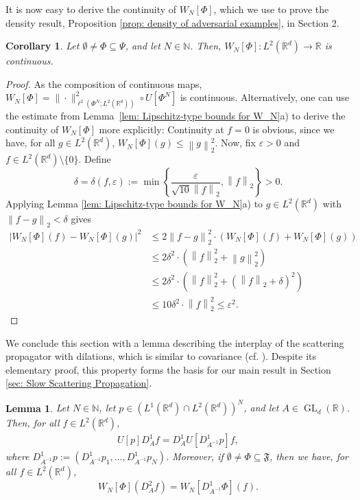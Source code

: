 \documentclass[11pt]{amsart}
\newcommand{\R}{{\mathbb{R}}}
\newcommand{\N}{\mathbb{N}}
\newcommand{\norm}[1]{\ensuremath{\left\lVert\text{}#1\text{}\right\rVert}}
\DeclareMathOperator{\GL}{GL}
\newtheorem{lemma}[theorem]{Lemma}
\newtheorem{corollary}[theorem]{Corollary}
\newenvironment{proof sketch} {\textit{Proof sketch.}}{}
\begin{document}
  It is now easy to derive the continuity of $W_N[\Phi]$, which we use to prove the density result, Proposition \ref{prop: density of adversarial examples}, in Section 2. 
  \begin{corollary}\label{cor: W_N is continuous}
    Let $\emptyset \neq \Phi \subseteq \Psi$, and let $N \in \N$. Then, $W_N[\Phi]:L^2(\R^d)\to \R$ is continuous.
  \end{corollary}
  \begin{proof}
    As the composition of continuous maps, $W_N[\Phi]= \lVert \text{} \cdot \text{} \rVert _{
    \ell ^{2}(\Phi ^{N};L^{2}({\mathbb{R}}^{d}))}^{2} \circ U[\Phi ^{N}]$ is continuous. Alternatively, one can use the estimate from Lemma~\ref{lem: Lipschitz-type bounds for W_N}a) to derive the continuity of $W_N[\Phi]$ more explicitly: Continuity at $f=0$ is obvious, since we have, for all $g \in L^2(\R^d)$, $W_N[\Phi](g)\leq \norm{g}_2^2$. Now, fix $\varepsilon>0$ and $f \in L^2(\R^d)\setminus\{0\}$. Define \[\delta=\delta(f,\varepsilon):=\min\left\{\frac{\varepsilon}{\sqrt{10} \norm{f}_2},\norm{f}_2\right\}>0.\] 
    Applying Lemma \ref{lem: Lipschitz-type bounds for W_N}a) to $g \in L^2(\R^d)$ with $\norm{f-g}_2<\delta$ gives
    \begin{align*}
      |W_N[\Phi](f)-W_N[\Phi](g)|^2 &\leq 2 \norm{f-g}_2^2 \cdot(W_N[\Phi](f)+W_N[\Phi](g))\\
      &\leq 2 \delta^2 \cdot (\norm{f}_2^2+\norm{g}_2^2) \\
      &\leq 2 \delta^2 \cdot (\norm{f}_2^2+(\norm{f}_2+\delta)^2) \\
      &\leq 10 \delta^2 \cdot \norm{f}_2^2 \leq \varepsilon^2.
    \end{align*}
  \end{proof}
  
  
  We conclude this section with a lemma describing the interplay of the scattering propagator with dilations, which is similar to covariance (cf. \cite[Equation (20)]{mallat2012group}). Despite its elementary proof, this property forms the basis for our main result in Section \ref{sec: Slow Scattering Propagation}.  
  \begin{lemma}\label{lemma: commuting U[p] with D_A}
    Let $N \in \N$, let $p\in (L^1(\R^d)\cap L^2(\R^d))^N$, and let $A \in \GL_d(\R)$.
    Then, for all $f \in L^2(\R^d)$,
    \begin{align*}
      U[p]D_{A}^1f=D_{A}^1U[D_{A^{-1}}^1p]f,
    \end{align*}
    where $D_{A^{-1}}^1p:=(D_{A^{-1}}^1p_1,\ldots,D_{A^{-1}}^1p_N)$.
    Moreover, if $\emptyset \neq \Phi \subseteq \mathfrak{F}$, then we have, for all $f \in L^2(\R^d)$,
    \[W_N[\Phi](D_{A}^2 f)=W_N[D_{A^{-1}}^1\Phi](f).\]
  \end{lemma}
  
\end{document}
